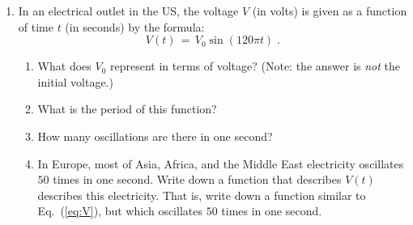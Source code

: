 \documentclass[12pt]{article}
\begin{document}
\begin{enumerate}
\item In an electrical outlet in the US, the voltage $V$ (in volts) is
  given as a function of time $t$ (in seconds) by the formula:
  \begin{equation}
    V(t) \, = \, V_0 \sin(120\pi t) \;.
    \label{eq:V}
  \end{equation}
  \begin{enumerate}
  \item What does $V_0$ represent in terms of voltage? (Note: the
    answer is \emph{not} the initial voltage.) 
  \item What is the period of this function?
  \item How many oscillations are there in one second?
  \item In Europe, most of Asia, Africa, and the Middle East
    electricity oscillates $50$ times in one second. Write down a
    function that describes $V(t)$ describes this electricity. That
    is, write down a function similar to Eq.~(\ref{eq:V}), but which
    oscillates $50$ times in one second.
  \end{enumerate}

  
\end{enumerate}
\end{document}
